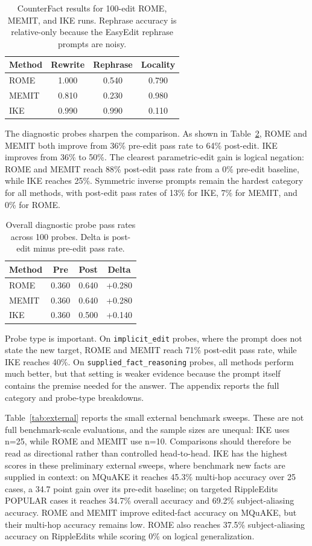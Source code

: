 \documentclass[11pt]{article}
\begin{document}
\begin{table}[t]
\centering
\small
\begin{tabular}{lccc}
\toprule
Method & Rewrite & Rephrase & Locality \\
\midrule
ROME & 1.000 & 0.540 & 0.790 \\
MEMIT & 0.810 & 0.230 & 0.980 \\
IKE & 0.990 & 0.990 & 0.110 \\
\bottomrule
\end{tabular}
\caption{CounterFact results for 100-edit ROME, MEMIT, and IKE runs. Rephrase accuracy is relative-only because the EasyEdit rephrase prompts are noisy.}
\label{tab:baseline}
\end{table}

The diagnostic probes sharpen the comparison. As shown in Table~\ref{tab:probes}, ROME and MEMIT both improve from 36\% pre-edit pass rate to 64\% post-edit. IKE improves from 36\% to 50\%. The clearest parametric-edit gain is logical negation: ROME and MEMIT reach 88\% post-edit pass rate from a 0\% pre-edit baseline, while IKE reaches 25\%. Symmetric inverse prompts remain the hardest category for all methods, with post-edit pass rates of 13\% for IKE, 7\% for MEMIT, and 0\% for ROME.

\begin{table}[t]
\centering
\small
\begin{tabular}{lccc}
\toprule
Method & Pre & Post & Delta \\
\midrule
ROME & 0.360 & 0.640 & +0.280 \\
MEMIT & 0.360 & 0.640 & +0.280 \\
IKE & 0.360 & 0.500 & +0.140 \\
\bottomrule
\end{tabular}
\caption{Overall diagnostic probe pass rates across 100 probes. Delta is post-edit minus pre-edit pass rate.}
\label{tab:probes}
\end{table}

Probe type is important. On \texttt{implicit\_edit} probes, where the prompt does not state the new target, ROME and MEMIT reach 71\% post-edit pass rate, while IKE reaches 40\%. On \texttt{supplied\_fact\_reasoning} probes, all methods perform much better, but that setting is weaker evidence because the prompt itself contains the premise needed for the answer. The appendix reports the full category and probe-type breakdowns.

Table~\ref{tab:external} reports the small external benchmark sweeps. These are not full benchmark-scale evaluations, and the sample sizes are unequal: IKE uses n=25, while ROME and MEMIT use n=10. Comparisons should therefore be read as directional rather than controlled head-to-head. IKE has the highest scores in these preliminary external sweeps, where benchmark new facts are supplied in context: on MQuAKE it reaches 45.3\% multi-hop accuracy over 25 cases, a 34.7 point gain over its pre-edit baseline; on targeted RippleEdits POPULAR cases it reaches 34.7\% overall accuracy and 69.2\% subject-aliasing accuracy. ROME and MEMIT improve edited-fact accuracy on MQuAKE, but their multi-hop accuracy remains low. ROME also reaches 37.5\% subject-aliasing accuracy on RippleEdits while scoring 0\% on logical generalization.
\end{document}
